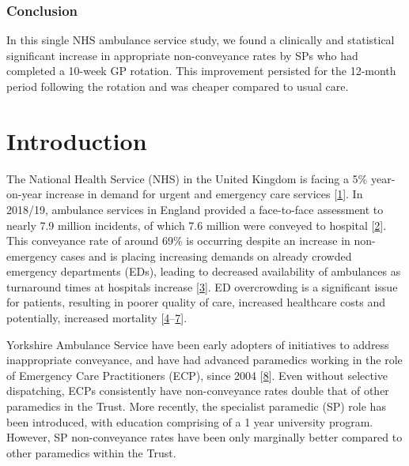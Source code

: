 \documentclass[
  a4paper,
  openany]{article}
\begin{document}
\hypertarget{conclusion}{%
\subsubsection*{Conclusion}\label{conclusion}}

In this single NHS ambulance service study, we found a clinically and statistical significant increase in appropriate non-conveyance rates by SPs who had completed a 10-week GP rotation. This improvement persisted for the 12-month period following the rotation and was cheaper compared to usual care.

\hypertarget{introduction-1}{%
\section*{Introduction}\label{introduction-1}}

The National Health Service (NHS) in the United Kingdom is facing a 5\% year-on-year increase in demand for urgent and emergency care services {[}\protect\hyperlink{ref-national_audit_office_nhs_2017}{1}{]}. In 2018/19, ambulance services in England provided a face-to-face assessment to nearly 7.9 million incidents, of which 7.6 million were conveyed to hospital {[}\protect\hyperlink{ref-nhs_england_ambulance_2019}{2}{]}. This conveyance rate of around 69\% is occurring despite an increase in non-emergency cases and is placing increasing demands on already crowded emergency departments (EDs), leading to decreased availability of ambulances as turnaround times at hospitals increase {[}\protect\hyperlink{ref-willett_addressing_2017}{3}{]}. ED overcrowding is a significant issue for patients, resulting in poorer quality of care, increased healthcare costs and potentially, increased mortality {[}\protect\hyperlink{ref-sun_effect_2013}{4}--\protect\hyperlink{ref-richardson_increase_2006}{7}{]}.

Yorkshire Ambulance Service have been early adopters of initiatives to address inappropriate conveyance, and have had advanced paramedics working in the role of Emergency Care Practitioners (ECP), since 2004 {[}\protect\hyperlink{ref-mason_developing_2003}{8}{]}. Even without selective dispatching, ECPs consistently have non-conveyance rates double that of other paramedics in the Trust. More recently, the specialist paramedic (SP) role has been introduced, with education comprising of a 1 year university program. However, SP non-conveyance rates have been only marginally better compared to other paramedics within the Trust.
\end{document}
